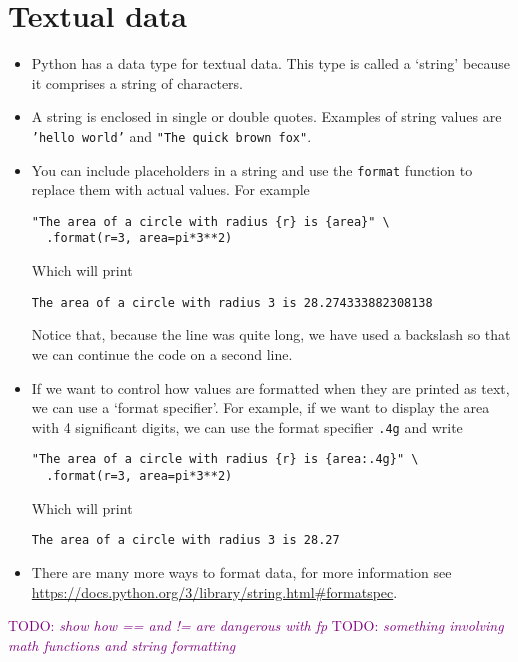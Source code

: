 \documentclass[a4paper,twoside]{memoir}
\makeatletter
\newcommand{\FrameTitle}[2]{%
  \fboxrule=\FrameRule \fboxsep=\FrameSep
  \fbox{\vbox{\nobreak \vskip -0.7\FrameSep
    \rlap{\centerline{\strut#1}}\nobreak\nointerlineskip%
    \vskip 0.7\FrameSep
    \hbox{#2}}}}
\newenvironment{framewithtitle}[2][\FrameFirst@Lab\ (cont.)]{%
  \def\FrameFirst@Lab{\textbf{#2}}%
  \def\FrameCont@Lab{\textbf{#1}}%
  \def\FrameCommand##1{%
    \FrameTitle{\FrameFirst@Lab}{##1}}%
  \def\FirstFrameCommand##1{%
    \FrameTitle{\FrameFirst@Lab}{##1}}%
  \def\MidFrameCommand##1{%
    \FrameTitle{\FrameCont@Lab}{##1}}%
  \def\LastFrameCommand##1{%
    \FrameTitle{\FrameCont@Lab}{##1}}%
\MakeFramed{\advance\hsize-\width \FrameRestore}}%
{\endMakeFramed}
\newcounter{exercisectr}
\newenvironment{exercise}
{\stepcounter{exercisectr}\begin{framewithtitle}{Practical \arabic{exercisectr}}}
{\end{framewithtitle}}
\newcommand{\shellcmd}{\texttt}
\newcommand{\TODO}[1]{\textcolor{purple}{TODO: \emph{#1}}}
\makeatother
\begin{document}
\section{Textual data}
\begin{itemize}
\item Python has a data type for textual data.  This type is called a `string' because it comprises a string of characters.
\item A string is enclosed in single or double quotes.  Examples of string values are \shellcmd{'hello world'} and \shellcmd{"The quick brown fox"}.
\item You can include placeholders in a string and use the \shellcmd{format} function to replace them with actual values.  For example
\begin{verbatim}
"The area of a circle with radius {r} is {area}" \
  .format(r=3, area=pi*3**2)
\end{verbatim}

Which will print
\begin{verbatim}
The area of a circle with radius 3 is 28.274333882308138
\end{verbatim}
Notice that, because the line was quite long, we have used a backslash so that we can continue the code on a second line.

\item If we want to control how values are formatted when they are printed as text, we can use a `format specifier'.  For example, if we want to display the area with 4 significant digits, we can use the format specifier \shellcmd{.4g} and write
\begin{verbatim}
"The area of a circle with radius {r} is {area:.4g}" \
  .format(r=3, area=pi*3**2)
\end{verbatim}

Which will print
\begin{verbatim}The area of a circle with radius 3 is 28.27\end{verbatim}

\item There are many more ways to format data, for more information see \url{https://docs.python.org/3/library/string.html#formatspec}.

\end{itemize}

\begin{exercise}
\TODO{show how == and != are dangerous with fp}
\TODO{something involving math functions and string formatting}
\end{exercise}

\end{document}
